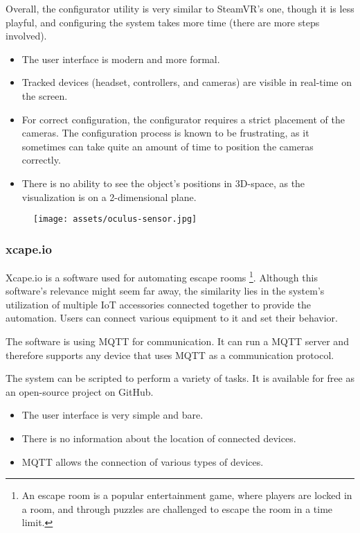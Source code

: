 Overall, the configurator utility is very similar to SteamVR’s one, though it
is less playful, and configuring the system takes more time (there are more steps
involved).


\begin{itemize}

\item The user interface is modern and more formal.

\item Tracked devices (headset, controllers, and cameras) are visible in real-time
on the screen.

\item For correct configuration, the configurator requires a strict placement
of the cameras. The configuration process is known to be frustrating,
as it sometimes can take quite an amount of time to position the cameras correctly.

\item There is no ability to see the object’s positions in 3D-space, as the visualization is
on a 2-dimensional plane.

\end{itemize}


\begin{figure}[h]{}
\centering\texttt{[image: assets/oculus-sensor.jpg]}
\caption{}

\end{figure}

\hypertarget{x-xcape.io}{\subsubsection*{xcape.io}}
Xcape.io is a software used for automating escape rooms
\footnote{An escape room is a popular entertainment game, where players are locked in a room, and through puzzles are challenged to escape the room in a time limit.}.
Although this software’s relevance might seem far away,
the similarity lies in the system’s utilization of multiple IoT accessories
connected together to provide the automation. Users can connect various
equipment to it and set their behavior.


The software is using MQTT for communication. It can run a MQTT server and
therefore supports any device that uses MQTT as a communication protocol.


The system can be scripted to perform a variety of tasks. It is available
for free as an open-source project on GitHub.


\begin{itemize}

\item The user interface is very simple and bare.

\item There is no information about the location of connected devices.

\item MQTT allows the connection of various types of devices.

\end{itemize}
